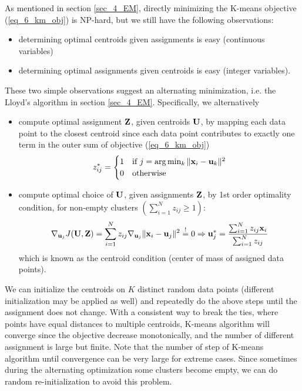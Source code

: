 \documentclass[../main.tex]{subfiles}
\begin{document}
\par As mentioned in section \ref{sec_4_EM}, directly minimizing the K-means objective (\ref{eq_6_km_obj}) is NP-hard, but we still have the following observations:
\begin{itemize}
	\item determining optimal centroids given assignments is easy (continuous variables)
	\item determining optimal assignments given centroids is easy (integer variables).
\end{itemize}
These two simple observations suggest an alternating minimization, i.e. the Lloyd's algorithm in section \ref{sec_4_EM}. Specifically, we alternatively
\begin{itemize}
	\item compute optimal assignment ${\bf Z}$, given centroids ${\bf U}$, by mapping each data point to the closest centroid since each data point contributes to exactly one term in the outer sum of objective (\ref{eq_6_km_obj})
	\begin{equation*}
	z_{ij}^*=\begin{cases}
	1&\text{if }j=\arg\min_k\|{\bf x}_i-{\bf u}_k\|^2\\
	0&\text{otherwise}
	\end{cases}
	\end{equation*}
	\item compute optimal choice of ${\bf U}$, given assignments ${\bf Z}$, by 1st order optimality condition, for non-empty clusters $(\sum_{i=1}^{N}z_{ij}\geq 1)$:
	\begin{equation*}
	\nabla_{{\bf u}_j}J({\bf U,Z})=\sum_{i=1}^{N}z_{ij}\nabla_{{\bf u}_j}\|{\bf x}_i-{\bf u}_j\|^2\overset{!}{=}0\Rightarrow {\bf u}_j^* =\frac{\sum_{i=1}^{N}z_{ij} {\bf x}_i}{\sum_{i=1}^{N}z_{ij}}
	\end{equation*}
	which is known as the centroid condition (center of mass of assigned data points).
\end{itemize}
We can initialize the centroids on $K$ distinct random data points (different initialization may be applied as well) and repeatedly do the above steps until the assignment does not change. With a consistent way to break the ties, where points have equal distances to multiple centroids, K-means algorithm will converge since the objective decrease monotonically, and the number of different assignment is large but finite. Note that the number of step of K-means algorithm until convergence can be very large for extreme cases. Since sometimes during the alternating optimization some clusters become empty, we can do random re-initialization to avoid this problem.
\end{document}
